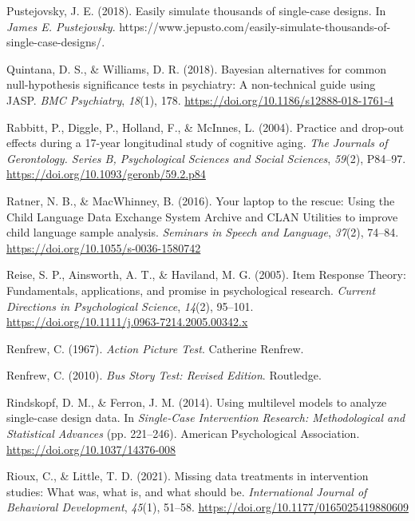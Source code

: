 \documentclass{krantz}
\newlength{\cslhangindent}
\newlength{\cslentryspacingunit} %
\newenvironment{CSLReferences}[2] %
{%
\setlength{\parindent}{0pt}
\ifodd #1
\let\oldpar\par
\def\par{\hangindent=\cslhangindent\oldpar}
\fi
\setlength{\parskip}{#2\cslentryspacingunit}
}%
{}
\begin{document}
\begin{CSLReferences}{1}{0}
\leavevmode{}%
Pustejovsky, J. E. (2018). Easily simulate thousands of single-case designs. In \emph{James E. Pustejovsky}. https://www.jepusto.com/easily-simulate-thousands-of-single-case-designs/.

\leavevmode{}%
Quintana, D. S., \& Williams, D. R. (2018). Bayesian alternatives for common null-hypothesis significance tests in psychiatry: A non-technical guide using {JASP}. \emph{BMC Psychiatry}, \emph{18}(1), 178. \url{https://doi.org/10.1186/s12888-018-1761-4}

\leavevmode{}%
Rabbitt, P., Diggle, P., Holland, F., \& McInnes, L. (2004). Practice and drop-out effects during a 17-year longitudinal study of cognitive aging. \emph{The Journals of Gerontology. Series B, Psychological Sciences and Social Sciences}, \emph{59}(2), P84--97. \url{https://doi.org/10.1093/geronb/59.2.p84}

\leavevmode{}%
Ratner, N. B., \& MacWhinney, B. (2016). Your laptop to the rescue: {Using} the {Child Language Data Exchange System Archive} and {CLAN Utilities} to improve child language sample analysis. \emph{Seminars in Speech and Language}, \emph{37}(2), 74--84. \url{https://doi.org/10.1055/s-0036-1580742}

\leavevmode{}%
Reise, S. P., Ainsworth, A. T., \& Haviland, M. G. (2005). Item {Response Theory}: {Fundamentals}, applications, and promise in psychological research. \emph{Current Directions in Psychological Science}, \emph{14}(2), 95--101. \url{https://doi.org/10.1111/j.0963-7214.2005.00342.x}

\leavevmode{}%
Renfrew, C. (1967). \emph{Action {Picture Test}}. {Catherine Renfrew}.

\leavevmode{}%
Renfrew, C. (2010). \emph{Bus {Story Test}: {Revised Edition}}. {Routledge}.

\leavevmode{}%
Rindskopf, D. M., \& Ferron, J. M. (2014). Using multilevel models to analyze single-case design data. In \emph{Single-{Case Intervention Research}: {Methodological} and {Statistical Advances}} (pp. 221--246). {American Psychological Association}. \url{https://doi.org/10.1037/14376-008}

\leavevmode{}%
Rioux, C., \& Little, T. D. (2021). Missing data treatments in intervention studies: {What} was, what is, and what should be. \emph{International Journal of Behavioral Development}, \emph{45}(1), 51--58. \url{https://doi.org/10.1177/0165025419880609}


\end{CSLReferences}
\end{document}
